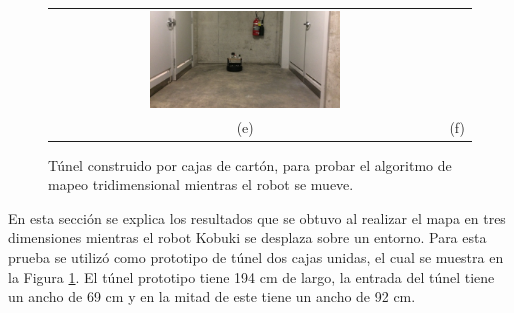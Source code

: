 \begin{figure}
\begin{tabular}{cc}
    \includegraphics[width=0.50\textwidth]{images/KobukiSotano6.JPG}\\
    (e)&(f)
  \end{tabular}
  \captionsetup{font=footnotesize}
  \caption{Túnel construido por cajas de cartón, para probar el algoritmo de mapeo 
          tridimensional mientras el robot se mueve.}
  \label{fig:tunel201}
\end{figure}
En esta sección se explica los resultados que se obtuvo al realizar el mapa en tres
dimensiones mientras el robot Kobuki se desplaza sobre un entorno. Para esta prueba se utilizó 
como prototipo de túnel dos cajas unidas, el cual se muestra en la Figura \ref{fig:tunel201}. 
El túnel prototipo tiene 194 cm de largo, la entrada del túnel tiene un ancho de 69 cm y en la 
mitad de este tiene un ancho de 92 cm.

